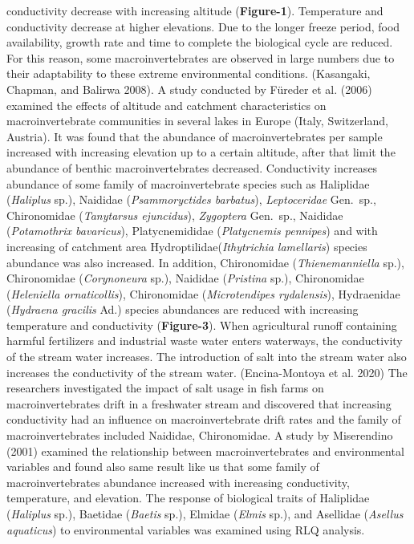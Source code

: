 \documentclass[
]{article}
\begin{document}
conductivity decrease with increasing altitude (\textbf{Figure-1}).
Temperature and conductivity decrease at higher elevations. Due to the
longer freeze period, food availability, growth rate and time to
complete the biological cycle are reduced. For this reason, some
macroinvertebrates are observed in large numbers due to their
adaptability to these extreme environmental conditions. (Kasangaki,
Chapman, and Balirwa 2008). A study conducted by Füreder et al. (2006)
examined the effects of altitude and catchment characteristics on
macroinvertebrate communities in several lakes in Europe (Italy,
Switzerland, Austria). It was found that the abundance of
macroinvertebrates per sample increased with increasing elevation up to
a certain altitude, after that limit the abundance of benthic
macroinvertebrates decreased. Conductivity increases abundance of some
family of macroinvertebrate species such as Haliplidae (\emph{Haliplus}
sp.), Naididae (\emph{Psammoryctides barbatus}), \emph{Leptoceridae}
Gen.~sp., Chironomidae (\emph{Tanytarsus ejuncidus}), \emph{Zygoptera}
Gen.~sp., Naididae (\emph{Potamothrix bavaricus}), Platycnemididae
(\emph{Platycnemis pennipes}) and with increasing of catchment area
Hydroptilidae(\emph{Ithytrichia lamellaris}) species abundance was also
increased. In addition, Chironomidae (\emph{Thienemanniella} sp.),
Chironomidae (\emph{Corynoneura} sp.), Naididae (\emph{Pristina} sp.),
Chironomidae (\emph{Heleniella ornaticollis}), Chironomidae
(\emph{Microtendipes rydalensis}), Hydraenidae (\emph{Hydraena gracilis}
Ad.) species abundances are reduced with increasing temperature and
conductivity (\textbf{Figure-3}). When agricultural runoff containing
harmful fertilizers and industrial waste water enters waterways, the
conductivity of the stream water increases. The introduction of salt
into the stream water also increases the conductivity of the stream
water. (Encina-Montoya et al. 2020) The researchers investigated the
impact of salt usage in fish farms on macroinvertebrates drift in a
freshwater stream and discovered that increasing conductivity had an
influence on macroinvertebrate drift rates and the family of
macroinvertebrates included Naididae, Chironomidae. A study by
Miserendino (2001) examined the relationship between macroinvertebrates
and environmental variables and found also same result like us that some
family of macroinvertebrates abundance increased with increasing
conductivity, temperature, and elevation. The response of biological
traits of Haliplidae (\emph{Haliplus} sp.), Baetidae (\emph{Baetis}
sp.), Elmidae (\emph{Elmis} sp.), and Asellidae (\emph{Asellus
aquaticus}) to environmental variables was examined using RLQ analysis.
\end{document}
